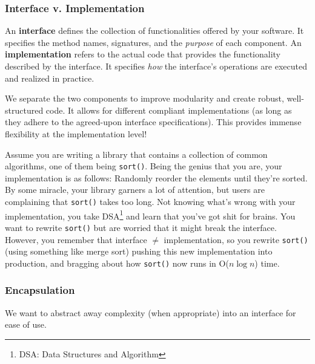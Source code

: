 \documentclass{article}
\begin{document}
\subsubsection*{Interface v. Implementation}
\begin{tcolorbox}[title=Definition: Interface and Implementation]
  An \textbf{interface} defines the collection of functionalities offered by your software. It
  specifies the method names, signatures, and the \textit{purpose} of each component. 
  \tcblower
  An \textbf{implementation} refers to the actual code that provides the functionality described by
  the interface. It specifies \textit{how} the interface's operations are executed and realized in practice. 
\end{tcolorbox}
We separate the two components to improve modularity and create robust, well-structured code. It
allows for different compliant implementations (as long as they adhere to the agreed-upon interface
specifications). This provides immense flexibility at the implementation level!

\begin{tcolorbox}[colback=blue!5!white,colframe=black!75!blue,title=Example: Sort Swapping]
  Assume you are writing a library that contains a collection of common algorithms, one of them
  being \texttt{sort()}. Being the genius that you are, your implementation is as follows: Randomly
  reorder the elements until they're sorted. By some miracle, your library garners a lot of
  attention, but users are complaining that \texttt{sort()} takes too long. Not knowing what's wrong
  with your implementation, you take DSA\footnote[1]{DSA: Data Structures and Algorithm} 
  and learn that you've got shit for brains. You want to rewrite \texttt{sort()} but are worried
  that it might break the interface. However, you remember that interface $\neq$ implementation, so
  you rewrite \texttt{sort()} (using something like merge sort) pushing this new implementation
  into production, and bragging about how \texttt{sort()} now runs in O($n \log n$) time. 
\end{tcolorbox}

\subsubsection*{Encapsulation}
We want to abstract away complexity (when appropriate) into an interface for ease of use.
\end{document}

